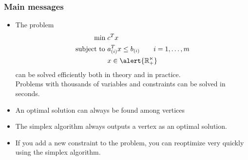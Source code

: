 \documentclass[9pt,handout]{beamer}
\begin{document}
\begin{frame}
\frametitle{Main messages}
\begin{itemize}
\item The problem
\begin{align*}
\min\; & c^T x\\
\text{subject to } & a_{(i)}^T x \leq b_{(i)}\qquad i=1,\ldots, m\\
& x\in \alert{\mathbb{R^n_+}}
\end{align*}
can be solved efficiently both \alert{in theory} and in \alert{practice}.\\
Problems with \alert{thousands} of variables and constraints can be solved in \alert{seconds}.\medskip
\item \alert{An} optimal solution can always be found among \alert{vertices}\medskip
\item The \alert{simplex algorithm} always outputs a \alert{vertex} as an optimal solution.\medskip
\item If you \alert{add a new constraint to the problem}, you can \alert{reoptimize} very quickly using the simplex algorithm.
\end{itemize}
\end{frame}
\end{document}
